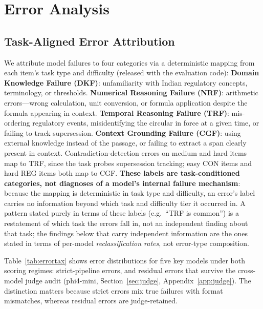 \section{Error Analysis}
\label{sec:errortax-sub}

\subsection{Task-Aligned Error Attribution}

We attribute model failures to four categories via a deterministic mapping from each item's task
type and difficulty (released with the evaluation code): \textbf{Domain Knowledge Failure (DKF)}:
unfamiliarity with Indian regulatory concepts, terminology, or thresholds. \textbf{Numerical
Reasoning Failure (NRF)}: arithmetic errors---wrong calculation, unit conversion, or formula
application despite the formula appearing in context. \textbf{Temporal Reasoning Failure (TRF)}:
mis-ordering regulatory events, misidentifying the circular in force at a given time, or failing to
track supersession. \textbf{Context Grounding Failure (CGF)}: using external knowledge instead of
the passage, or failing to extract a span clearly present in context. Contradiction-detection errors
on medium and hard items map to TRF, since the task probes supersession tracking; easy CON items and
hard REG items both map to CGF. \textbf{These labels are task-conditioned categories, not
diagnoses of a model's internal failure mechanism}: because the mapping is deterministic in task
type and difficulty, an error's label carries no information beyond which task and difficulty tier
it occurred in. A pattern stated purely in terms of these labels (e.g.\ ``TRF is common'') is a
restatement of which task the errors fall in, not an independent finding about that task; the
findings below that carry independent information are the ones stated in terms of per-model
\emph{reclassification rates}, not error-type composition.

Table~\ref{tab:errortax} shows error distributions for five key models under both scoring regimes: strict-pipeline errors, and residual errors that survive the cross-model judge audit (phi4-mini, Section~\ref{sec:judge}, Appendix~\ref{app:judge}). The distinction matters because strict errors mix true failures with format mismatches, whereas residual errors are judge-retained.

\begin{table}[t]
\centering\small

\caption{Error distribution by type for five key models under strict scoring and after cross-model judge audit (residual). DKF: Domain Knowledge Failure; NRF: Numerical Reasoning Failure; TRF: Temporal Reasoning Failure; CGF: Context Grounding Failure. Models selected as top performer (Gemini 2.5 Flash), bottom performer (Gemma 3 4B), and three distinctive profiles. Counts derive from the released rule-based mapping and per-item judge verdicts; CON errors are not judge-reviewed, so they persist into the residual column unconditionally.}
\label{tab:errortax}
\end{table}

